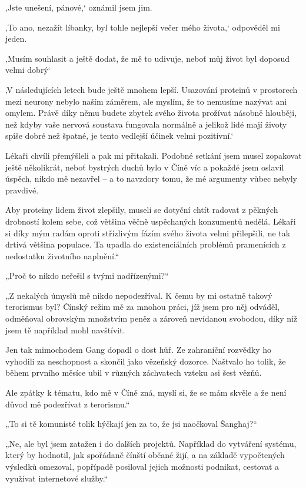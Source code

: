 {‚Jste unešení, pánové,‘ oznámil jsem jim.

‚To ano, nezažít líbanky, byl tohle nejlepší večer mého života,‘ odpověděl mi jeden.

‚Musím souhlasit a ještě dodat, že mě to udivuje, neboť můj život byl doposud velmi dobrý‘

‚V následujících letech bude ještě mnohem lepší. Usazování proteinů v prostorech mezi neurony nebylo naším záměrem, ale myslím, že to nemusíme nazývat ani omylem. Právě díky němu budete zbytek svého života prožívat násobně hlouběji, než kdyby vaše nervová soustava fungovala normálně a jelikož lidé mají životy spíše dobré než špatné, je tento vedlejší účinek velmi pozitivní.‘ 

Lékaři chvíli přemýšleli a pak mi přitakali. Podobné setkání jsem musel zopakovat ještě několikrát, neboť bystrých duchů bylo v Číně víc a pokaždé jsem oslavil úspěch, nikdo mě nezavřel – a to navzdory tomu, že mé argumenty vůbec nebyly pravdivé.

Aby proteiny lidem život zlepšily, museli se dotyční chtít radovat z pěkných drobností kolem sebe, což většina věčně uspěchaných konzumentů nedělá. Lékaři si díky mým radám oproti střízlivým fázím svého života velmi přilepšili, ne tak drtivá většina populace. Ta upadla do existenciálních problémů pramenících z nedostatku životního naplnění.“

„Proč to nikdo neřešil s tvými nadřízenými?“

„Z nekalých úmyslů mě nikdo nepodezříval. K čemu by mi ostatně takový terorismus byl? Čínský režim mě za mnohou práci, jíž jsem pro něj odváděl, odměňoval obrovským množstvím peněz a zároveň nevídanou svobodou, díky níž jsem tě například mohl navštívit. 

Jen tak mimochodem Gang dopadl o dost hůř. Ze zahraniční rozvědky ho vyhodili za neschopnost a skončil jako vězeňský dozorce. Naštvalo ho tolik, že během prvního měsíce ubil v různých záchvatech vzteku asi šest vězňů.

Ale zpátky k tématu, kdo mě v Číně zná, myslí si, že se mám skvěle a že není důvod mě podezřívat z terorismu.“

„To si tě komunisté tolik hýčkají jen za to, že jsi naočkoval Šanghaj?“

„Ne, ale byl jsem zatažen i do dalších projektů. Například do vytváření systému, který by hodnotil, jak spořádaně čínští občané žijí, a na základě vypočtených výsledků omezoval, popřípadě posiloval jejich možnosti podnikat, cestovat a využívat internetové služby.“

}
